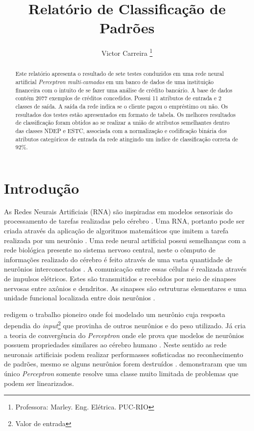 \documentclass[journal, a4paper]{IEEEtran}
\begin{document}
	\title{Relatório de Classificação de Padrões}
	\author{Victor Carreira
	\thanks{Professora: Marley. Eng. Elétrica. PUC-RIO}}
	\maketitle

\begin{abstract}
	Este relatório apresenta o resultado de sete testes conduzidos em uma rede neural artificial \textit{Perceptron multi-camadas} em um banco de dados de uma instituição financeira com o intuito de se fazer uma análise de crédito bancário.  A base de dados contém 2077 exemplos de créditos concedidos. Possui 11 atributos de entrada e 2 classes de saída. A saída da rede indica se o cliente pagou o empréstimo ou não. Os resultados dos testes estão apresentados em formato de tabela. Os melhores resultados de classificação foram obtidos ao se realizar a união de atributos semelhantes dentro das classes NDEP e ESTC, associada com  a normalização e codificação binária dos atributos categóricos de entrada da rede atingindo um índice de classificação correta de $92\%$.  
\end{abstract}


\section{Introdução}
    As Redes Neurais Artificiais (RNA) são inspiradas em modelos sensoriais do processamento de tarefas realizadas pelo cérebro \citep{Hagan1996}. Uma RNA, portanto pode ser criada através da aplicação de algoritmos matemáticos que imitem a tarefa realizada por um neurônio \citep{Nedjah2016}. Uma rede neural artificial possui semelhanças com a rede biológica presente no sistema nervoso central, neste o cômputo de informações realizado do cérebro é feito através de uma vasta quantidade de neurônios interconectados \citep{Feldman1988,Poulton2002}. A comunicação entre essas células é realizada através de impulsos elétricos. Estes são transmitidos e recebidos por meio de sinapses nervosas entre axônios e dendritos. As sinapses são estruturas elementares e uma unidade funcional localizada entre dois neurônios \citep{Krogh2008}.

	\citet{McCulloch1943} redigem o trabalho pioneiro onde foi modelado um neurônio cuja resposta dependia do \textit{input}\footnote{Valor de entrada} que provinha de outros neurônios e do peso utilizado.  Já \citet{Rosenblatt1962} cria a teoria de convergência do \textit{Perceptron} onde ele prova que modelos de neurônios possuem propriedades similares ao cérebro humano \citep{Kanal2001}. Neste sentido as rede neuronais artificiais podem realizar performasses sofisticadas no reconhecimento de padrões, mesmo se alguns neurônios forem destruídos \citep{Levy1997}. \citet{Minsky1969} demonstraram que um único  \textit{Perceptron} somente resolve uma classe muito limitada de problemas que podem ser linearizados.
	
\end{document}

